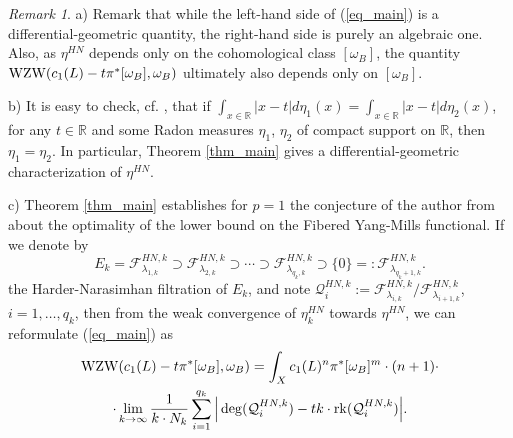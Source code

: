\documentclass[12pt]{article}
\numberwithin{equation}{section}
\theoremstyle{theorem}
\theoremstyle{definition}
\theoremstyle{remark}
\newtheorem{rem}[thm]{Remark}
\newcommand{\real}{\mathbb{R}}
\newcommand{\rk}[1]{{\rm{rk}} ( #1 )}
\begin{document}
	\begin{rem}
		\begin{sloppypar} 
		a) Remark that while the left-hand side of (\ref{eq_main}) is a differential-geometric quantity, the right-hand side is purely an algebraic one.
		Also, as $\eta^{HN}$ depends only on the cohomological class $[\omega_B]$, the quantity ${\rm{WZW}}(c_1(L) - t \pi^* [\omega_B], \omega_B)$ ultimately also depends only on $[\omega_B]$.
		\end{sloppypar}
		\par  
		b) It is easy to check, cf. \cite[Proposition 5.1]{ChenMaclean}, that if $\int_{x \in \real} |x - t| d \eta_1(x) = \int_{x \in \real} |x - t| d \eta_2(x)$, for any $t \in \real$ and some Radon measures $\eta_1$, $\eta_2$ of compact support on $\real$, then $\eta_1 = \eta_2$.
		In particular, Theorem \ref{thm_main} gives a differential-geometric characterization of $\eta^{HN}$.
		\par 
		c) Theorem \ref{thm_main} establishes for $p = 1$ the conjecture of the author from \cite{FinHNII} about the optimality of the lower bound on the Fibered Yang-Mills functional.
		If we denote by
	\begin{equation}\label{eq_resol_hn_filt00}
		E_k = \mathcal{F}^{HN, k}_{\lambda_{1, k}} \supset \mathcal{F}^{HN, k}_{\lambda_{2, k}} \supset \cdots \supset \mathcal{F}^{HN, k}_{\lambda_{q_k, k}} \supset \{0\} =: \mathcal{F}^{HN, k}_{\lambda_{q_k + 1, k}}.
	\end{equation}
		the Harder-Narasimhan filtration of $E_k$, and note $\mathcal{Q}_{i}^{HN, k} := \mathcal{F}^{HN, k}_{\lambda_{i, k}} / \mathcal{F}^{HN, k}_{\lambda_{i + 1, k}}$, $i = 1, \ldots, q_k$, then from the weak convergence of $\eta_k^{HN}$ towards $\eta^{HN}$, we can reformulate (\ref{eq_main}) as
		\begin{multline}\label{eq_main_ref}
			{\rm{WZW}}(c_1(L) - t \pi^* [\omega_B], \omega_B) 
			= 
			\int_X c_1(L)^n \pi^* [\omega_B]^m
			\cdot
			(n + 1)
			\cdot
			\\
			\cdot
			\lim_{k \to \infty} \frac{1}{k \cdot N_k} \sum_{i = 1}^{q_k} \Big| \deg (\mathcal{Q}_{i}^{HN, k}) - tk \cdot \rk{\mathcal{Q}_{i}^{HN, k}} \Big|.
		\end{multline}
	\end{rem}
	\par 
\end{document}
